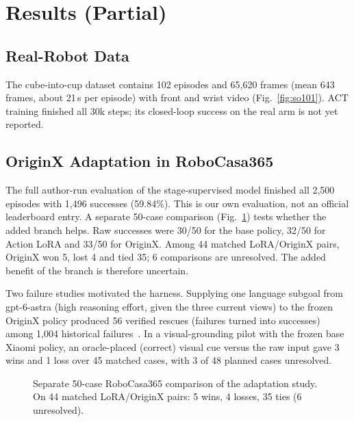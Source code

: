 \documentclass[conference]{IEEEtran}
\begin{document}
\section{Results (Partial)}

\subsection{Real-Robot Data}
The cube-into-cup dataset contains 102 episodes and 65,620 frames (mean 643 frames, about 21\,s per episode) with front and wrist video (Fig.~\ref{fig:so101}). ACT training finished all 30k steps; its closed-loop success on the real arm is not yet reported.

\subsection{OriginX Adaptation in RoboCasa365}
The full author-run evaluation of the stage-supervised model finished all 2,500 episodes with 1,496 successes (59.84\%). This is our own evaluation, not an official leaderboard entry. A separate 50-case comparison (Fig.~\ref{fig:robocasa}) tests whether the added branch helps. Raw successes were 30/50 for the base policy, 32/50 for Action LoRA and 33/50 for OriginX. Among 44 matched LoRA/OriginX pairs, OriginX won 5, lost 4 and tied 35; 6 comparisons are unresolved. The added benefit of the branch is therefore uncertain.

Two failure studies motivated the harness. Supplying one language subgoal from gpt-6-astra (high reasoning effort, given the three current views) to the frozen OriginX policy produced 56 verified rescues (failures turned into successes) among 1,004 historical failures~\cite{ma2026originx}. In a visual-grounding pilot with the frozen base Xiaomi policy, an oracle-placed (correct) visual cue versus the raw input gave 3 wins and 1 loss over 45 matched cases, with 3 of 48 planned cases unresolved.

\begin{figure}[t]
\centering
{}
\caption{Separate 50-case RoboCasa365 comparison of the adaptation study. On 44 matched LoRA/OriginX pairs: 5 wins, 4 losses, 35 ties (6 unresolved).}
\label{fig:robocasa}
\end{figure}
\end{document}
